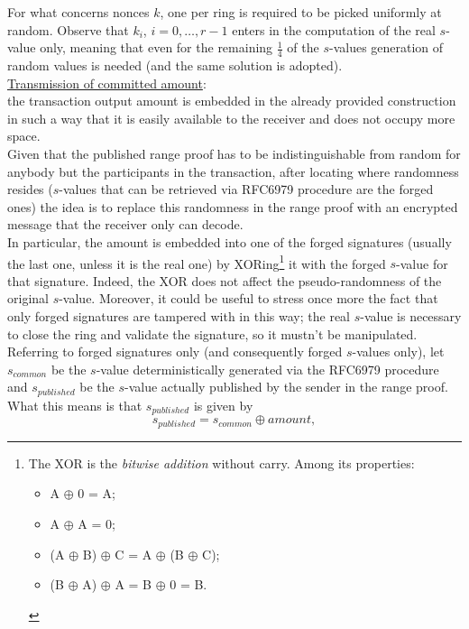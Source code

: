 For what concerns nonces $k$, one per ring is required to be picked uniformly at random. Observe that $k_i$, $i = 0, \dots, r-1$ enters in the computation of the real $s$-value only, meaning that even for the remaining $\frac{1}{4}$ of the $s$-values generation of random values is needed (and the same solution is adopted).\\
\underline{Transmission of committed amount}:\\
the transaction output amount is embedded in the already provided construction in such a way that it is easily available to the receiver and does not occupy more space.\\
Given that the published range proof has to be indistinguishable from random for anybody but the participants in the transaction, after locating where randomness resides ($s$-values that can be retrieved via RFC6979 procedure are the forged ones) the idea is to replace this randomness in the range proof with an encrypted message that the receiver only can decode.\\
In particular, the amount is embedded into one of the forged signatures (usually the last one, unless it is the real one) by XORing\footnote{The XOR is the \textit{bitwise addition} without carry. Among its properties: 
\begin{itemize}
    \item A $\oplus$ 0 = A;
    \item A $\oplus$ A = 0;
    \item (A $\oplus$ B) $\oplus$ C = A $\oplus$ (B $\oplus$ C);
    \item (B $\oplus$ A) $\oplus$ A = B $\oplus$ 0 = B.
\end{itemize}} it with the forged $s$-value for that signature. Indeed, the XOR does not affect the pseudo-randomness of the original $s$-value. Moreover, it could be useful to stress once more the fact that only forged signatures are tampered with in this way; the real $s$-value is necessary to close the ring and validate the signature, so it mustn't be manipulated.\\
Referring to forged signatures only (and consequently forged $s$-values only), let $s_{common}$ be the $s$-value deterministically generated via the RFC6979 procedure and $s_{published}$ be the $s$-value actually published by the sender in the range proof. What this means is that $s_{published}$ is given by
\begin{equation*}
    s_{published} = s_{common} \oplus amount,
\end{equation*}
